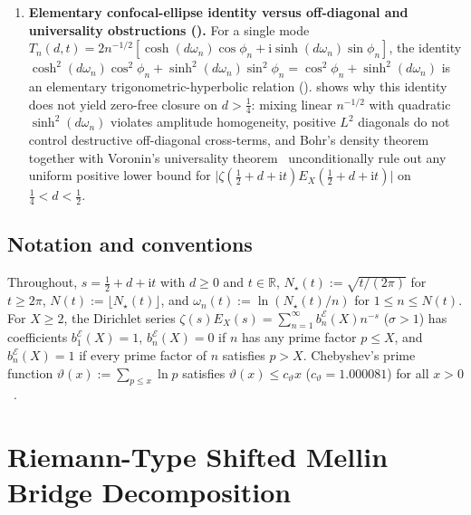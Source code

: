 \documentclass[11pt,reqno]{amsart}
\theoremstyle{plain}
\theoremstyle{definition}
\theoremstyle{remark}
\numberwithin{equation}{section}
\newcommand{\ii}{\mathrm{i}}
\begin{document}
\begin{enumerate}[label=\textup{(\arabic*)},leftmargin=2.2em]
\item \textbf{Elementary confocal-ellipse identity versus off-diagonal and universality obstructions ().} For a single mode $T_n(d,t) = 2n^{-1/2}[\cosh(d\omega_n)\cos\phi_n + \ii\sinh(d\omega_n)\sin\phi_n]$, the identity $\cosh^2(d\omega_n)\cos^2\phi_n + \sinh^2(d\omega_n)\sin^2\phi_n = \cos^2\phi_n + \sinh^2(d\omega_n)$ is an elementary trigonometric-hyperbolic relation ().  shows why this identity does not yield zero-free closure on $d > \frac{1}{4}$: mixing linear $n^{-1/2}$ with quadratic $\sinh^2(d\omega_n)$ violates amplitude homogeneity, positive $L^2$ diagonals do not control destructive off-diagonal cross-terms, and Bohr's density theorem together with Voronin's universality theorem~\cite{voronin1975} unconditionally rule out any uniform positive lower bound for $\lvert\zeta(\frac{1}{2}+d+\ii t)E_X(\frac{1}{2}+d+\ii t)\rvert$ on $\frac{1}{4} < d < \frac{1}{2}$.
\end{enumerate}

\subsection{Notation and conventions}\label{subsec:notation}

Throughout, $s = \frac{1}{2} + d + \ii t$ with $d \ge 0$ and $t \in \mathbb{R}$, $N_\star(t) := \sqrt{t/(2\pi)}$ for $t \ge 2\pi$, $N(t) := \lfloor N_\star(t)\rfloor$, and $\omega_n(t) := \ln(N_\star(t)/n)$ for $1 \le n \le N(t)$. For $X \ge 2$, the Dirichlet series $\zeta(s)E_X(s) = \sum_{n=1}^{\infty} b_n^{\mathcal{E}}(X)n^{-s}$ ($\sigma > 1$) has coefficients $b_1^{\mathcal{E}}(X) = 1$, $b_n^{\mathcal{E}}(X) = 0$ if $n$ has any prime factor $p \le X$, and $b_n^{\mathcal{E}}(X) = 1$ if every prime factor of $n$ satisfies $p > X$. Chebyshev's prime function $\vartheta(x) := \sum_{p \le x}\ln p$ satisfies $\vartheta(x) \le c_\vartheta x$ ($c_\vartheta = 1.000081$) for all $x > 0$~\cite{rosserschoenfeld1962}.

\section{Riemann-Type Shifted Mellin Bridge Decomposition}\label{sec:bridge}
\end{document}
